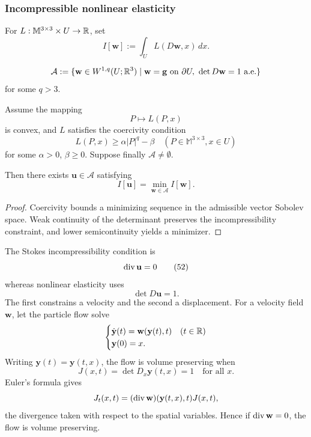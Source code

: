 \subsubsection{Incompressible nonlinear elasticity}

For $L:\mathbb M^{3\times3}\times U\to\mathbb{R}$, set
\[
I[\mathbf w]:=\int_U L(D\mathbf w,x)\,dx.
\]

\begin{definition}
\label{def:admissible-class-incompressible-elasticity}
\[
\mathcal{A} := \{\mathbf{w} \in W^{1,q}(U; \mathbb{R}^3) \mid \mathbf{w} = \mathbf{g} \text{ on } \partial U,\ \det D\mathbf{w} = 1 \text{ a.e.}\}
\]
for some $q > 3$.
\end{definition}

\begin{theorem}
\label{thm:existence-minimizer-determinant-constraint}

Assume the mapping
\[
P \mapsto L(P,x)
\]
is convex, and $L$ satisfies the coercivity condition
\[
L(P,x) \geq \alpha|P|^q - \beta \quad (P \in \mathbb{M}^{3 \times 3}, x \in U)
\]
for some $\alpha > 0$, $\beta \geq 0$. Suppose finally $\mathcal{A} \neq \emptyset$.

Then there exists $\mathbf{u} \in \mathcal{A}$ satisfying
\[
I[\mathbf{u}] = \min_{\mathbf{w} \in \mathcal{A}} I[\mathbf{w}].
\]
\end{theorem}

\begin{proof}
\sketch Coercivity bounds a minimizing sequence in the admissible vector Sobolev space. Weak continuity of the determinant preserves the incompressibility constraint, and lower semicontinuity yields a minimizer.
\end{proof}

\begin{remark}
\label{rem:incompressibility-euler-formula}

The Stokes incompressibility condition is
\[
\operatorname{div} \mathbf{u} = 0
\tag{52}
\]
whereas nonlinear elasticity uses
\[
\det D\mathbf{u} = 1.
\tag{53}
\]
The first constrains a velocity and the second a displacement. For a velocity field $\mathbf w$, let the particle flow solve
\[
\begin{cases}
\dot{\mathbf{y}}(t) = \mathbf{w}(\mathbf{y}(t), t) & (t \in \mathbb{R}) \\
\mathbf{y}(0) = x.
\end{cases}
\]
Writing $\mathbf y(t)=\mathbf y(t,x)$, the flow is volume preserving when
\[
J(x, t) = \det D_x \mathbf{y}(t, x) = 1 \quad \text{for all } x.
\]
Euler's formula gives
\[
J_t(x, t) = (\operatorname{div} \mathbf{w})(\mathbf{y}(t, x), t)J(x, t),
\]
the divergence taken with respect to the spatial variables. Hence if $\operatorname{div} \mathbf{w} = 0$, the flow is volume preserving.
\end{remark}

